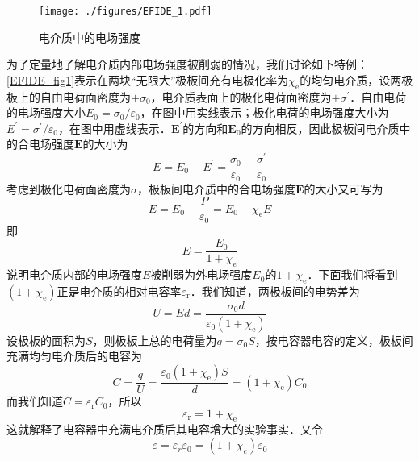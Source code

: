 \begin{figure}[ht]
\centering
\texttt{[image: ./figures/EFIDE\_1.pdf]}
\caption{电介质中的电场强度} \label{EFIDE_fig1}
\end{figure}
为了定量地了解电介质内部电场强度被削弱的情况，我们讨论如下特例：\autoref{EFIDE_fig1}表示在两块“无限大”极板间充有电极化率为$\chi_\mathrm{e}$的均匀电介质，设两极板上的自由电荷面密度为$\pm \sigma_0$，电介质表面上的极化电荷面密度为$\pm \sigma^\prime$．自由电荷的电场强度大小$E_{0}=\sigma_{0} / \varepsilon_{0}$，在图中用实线表示；极化电荷的电场强度大小为$E^{\prime}=\sigma^{\prime} / \varepsilon_{0}$，在图中用虚线表示．$\mathbf E^\prime$的方向和$\mathbf E_0$的方向相反，因此极板间电介质中的合电场强度$\mathbf E $的大小为
\begin{equation}
E=E_{0}-E^{\prime}=\frac{\sigma_{0}}{\varepsilon_{0}}-\frac{\sigma^{\prime}}{\varepsilon_{0}}
\end{equation}
考虑到极化电荷面密度为$\sigma$，极板间电介质中的合电场强度$\mathbf E $的大小又可写为
\begin{equation}
E=E_{0}-\frac{P}{\varepsilon_{0}}=E_{0}-\chi_{\mathrm e} E
\end{equation}
即
\begin{equation}
E=\frac{E_{0}}{1+\chi_{\mathrm{e}}}
\end{equation}
说明电介质内部的电场强度$E $被削弱为外电场强度$E_0$的${1+\chi_{\mathrm{e}}}$．下面我们将看到$({1+\chi_{\mathrm{e}}})$正是电介质的相对电容率$\varepsilon_\mathrm{r}$．我们知道，两极板间的电势差为
\begin{equation}
U=E d=\frac{\sigma_{0} d}{\varepsilon_{0}\left(1+\chi_{\mathrm e}\right)}
\end{equation}
设极板的面积为$S$，则极板上总的电荷量为$q=\sigma_{0} S$，按电容器电容的定义，极板间充满均匀电介质后的电容为
\begin{equation}
C=\frac{q}{U}=\frac{\varepsilon_{0}\left(1+\chi_{\mathrm e}\right) S}{d}=\left(1+\chi_{\mathrm e}\right) C_{0}
\end{equation}
而我们知道$C=\varepsilon_\mathrm{r}C_0$，所以
\begin{equation}
\varepsilon_{\mathrm{r}}=1+\chi_{\mathrm{e}}
\end{equation}
这就解释了电容器中充满电介质后其电容增大的实验事实．又令
\begin{equation}
\varepsilon=\varepsilon_{r} \varepsilon_{0}=\left(1+\chi_{e}\right) \varepsilon_{0}
\end{equation}